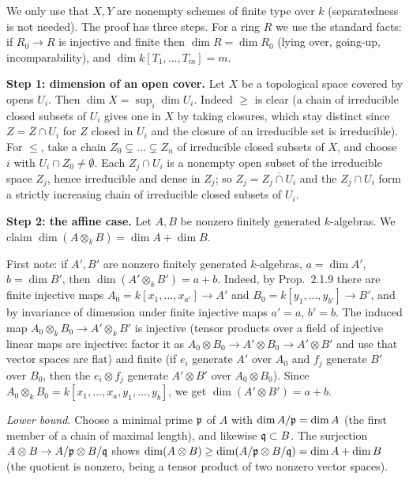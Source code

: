 \documentclass[11pt]{article}
\begin{document}
\pf
We only use that $X,Y$ are nonempty schemes of finite type over $k$ (separatedness is not needed). The proof has three steps. For a ring $R$ we use the standard facts: if $R_0\to R$ is injective and finite then $\dim R=\dim R_0$ (lying over, going-up, incomparability), and $\dim k[T_1,\dots,T_m]=m$.

\textbf{Step 1: dimension of an open cover.} Let $X$ be a topological space covered by opens $U_i$. Then $\dim X=\sup_i\dim U_i$. Indeed $\ge$ is clear (a chain of irreducible closed subsets of $U_i$ gives one in $X$ by taking closures, which stay distinct since $Z=\overline{Z}\cap U_i$ for $Z$ closed in $U_i$ and the closure of an irreducible set is irreducible). For $\le$, take a chain $Z_0\subsetneq\dots\subsetneq Z_n$ of irreducible closed subsets of $X$, and choose $i$ with $U_i\cap Z_0\neq\emptyset$. Each $Z_j\cap U_i$ is a nonempty open subset of the irreducible space $Z_j$, hence irreducible and dense in $Z_j$; so $Z_j=\overline{Z_j\cap U_i}$ and the $Z_j\cap U_i$ form a strictly increasing chain of irreducible closed subsets of $U_i$.

\textbf{Step 2: the affine case.} Let $A,B$ be nonzero finitely generated $k$-algebras. We claim $\dim(A\otimes_kB)=\dim A+\dim B$.

First note: if $A',B'$ are nonzero finitely generated $k$-algebras, $a=\dim A'$, $b=\dim B'$, then $\dim(A'\otimes_kB')=a+b$. Indeed, by Prop.~2.1.9 there are finite injective maps $A_0=k[x_1,\dots,x_{a'}]\to A'$ and $B_0=k[y_1,\dots,y_{b'}]\to B'$, and by invariance of dimension under finite injective maps $a'=a$, $b'=b$. The induced map $A_0\otimes_kB_0\to A'\otimes_kB'$ is injective (tensor products over a field of injective linear maps are injective: factor it as $A_0\otimes B_0\to A'\otimes B_0\to A'\otimes B'$ and use that vector spaces are flat) and finite (if $e_i$ generate $A'$ over $A_0$ and $f_j$ generate $B'$ over $B_0$, then the $e_i\otimes f_j$ generate $A'\otimes B'$ over $A_0\otimes B_0$). Since $A_0\otimes_kB_0=k[x_1,\dots,x_a,y_1,\dots,y_b]$, we get $\dim(A'\otimes B')=a+b$.

\emph{Lower bound.} Choose a minimal prime $\mathfrak p$ of $A$ with $\dim A/\mathfrak p=\dim A$ (the first member of a chain of maximal length), and likewise $\mathfrak q\subset B$. The surjection $A\otimes B\to A/\mathfrak p\otimes B/\mathfrak q$ shows $\dim(A\otimes B)\ge\dim(A/\mathfrak p\otimes B/\mathfrak q)=\dim A+\dim B$ (the quotient is nonzero, being a tensor product of two nonzero vector spaces).
\end{document}
